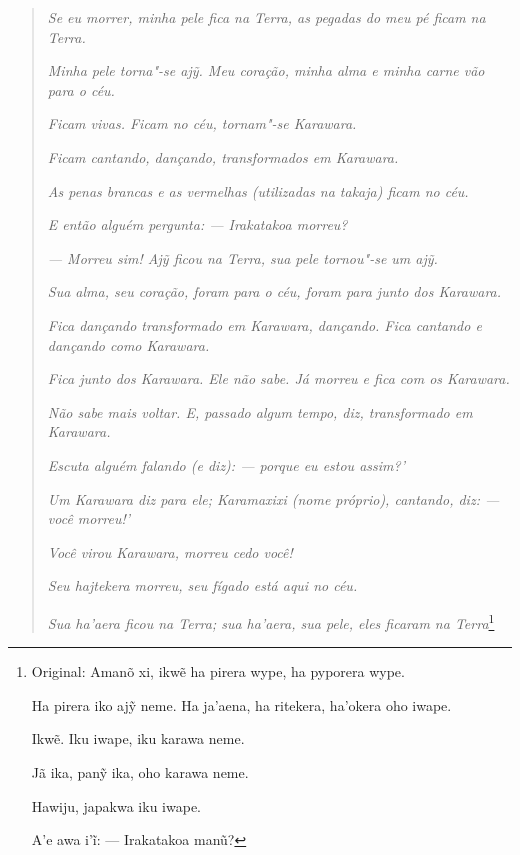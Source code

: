 \begin{quote}
\emph{Se eu morrer, minha pele fica na Terra, as pegadas do meu pé ficam na
Terra.}

\noindent\emph{Minha pele torna"-se \emph{ajỹ}. Meu coração, minha alma e minha carne
vão para o céu.}

\noindent\emph{Ficam vivas. Ficam no céu, tornam"-se \emph{Karawara}.}

\noindent\emph{Ficam cantando, dançando, transformados em \emph{Karawara}.}

\noindent\emph{As penas brancas e as vermelhas (utilizadas na \emph{takaja}) ficam no
céu.}

\noindent\emph{E então alguém pergunta: --- Irakatakoa morreu?}

\noindent\emph{--- Morreu sim! \emph{Ajỹ} ficou na Terra, sua pele tornou"-se um
\emph{ajỹ}.}

\noindent\emph{Sua alma, seu coração, foram para o céu, foram para junto dos \emph{Karawara}.}

\noindent\emph{Fica dançando transformado em \emph{Karawara}, dançando. Fica cantando e
dançando como \emph{Karawara}.}

\noindent\emph{Fica junto dos \emph{Karawara}. Ele não sabe. Já morreu e fica com os
\emph{Karawara}.}

\noindent\emph{Não sabe mais voltar. E, passado algum tempo, diz, transformado em
\emph{Karawara}.}

\noindent\emph{Escuta alguém falando (e diz): --- porque eu estou assim?'}

\noindent\emph{Um \emph{Karawara} diz para ele; Karamaxixi (nome próprio), cantando,
diz: --- você morreu!'}

\noindent\emph{Você virou \emph{Karawara}, morreu cedo você!}

\noindent\emph{Seu \emph{hajtekera} morreu, seu fígado está aqui no céu.}

\noindent\emph{Sua \emph{ha'aera} ficou na Terra; sua \emph{ha'aera}, sua pele, eles
ficaram na Terra}\footnote{Original: Amanõ xi, ikwẽ ha pirera wype, ha
  pyporera wype.

  Ha pirera iko ajỹ neme. Ha ja'aena, ha ritekera, ha'okera oho iwape.

  Ikwẽ. Iku iwape, iku karawa neme.

  Jã ika, panỹ ika, oho karawa neme.

  Hawiju, japakwa iku iwape.

  A'e awa i'ĩ: --- Irakatakoa manũ?

}
\end{quote}
